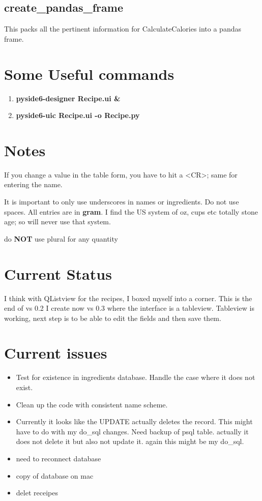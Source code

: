\documentclass[12pt]{article}
\begin{document}
\subsection{create\_pandas\_frame}
This packs all the pertinent information for CalculateCalories into a pandas frame.


\section{Some Useful commands}
\begin{enumerate}
\item {\bf pyside6-designer Recipe.ui \&}
\item {\bf pyside6-uic Recipe.ui -o Recipe.py}
\end{enumerate}

\section{Notes}
If you change a value in the table form, you have to hit a <CR>; same for entering the name.

It is important to only use underscores in names or ingredients. Do not use spaces. All entries are in {\bf gram}. I find the US system of oz, cups etc totally stone age; so will never use that system.

do {\bf NOT} use plural for any quantity

\section{Current Status}
I think with QListview for the recipes, I boxed myself into a corner. This is the end of vs 0.2
I create now vs 0.3 where the interface is a tableview. Tableview is working, next step is to be able to edit the fields and then save them.

\section{Current issues}
\begin{itemize}
\item Test for existence in ingredients database. Handle the case where it does not exist.
\item Clean up the code with consistent name scheme.
\item Currently it looks like the UPDATE actually deletes the record. This might have to do with my do\_sql changes. 
Need backup of psql table. actually it does not delete it but also not update it. again this might be my do\_sql.

\item need to reconnect database
\item copy of database on mac
\item delet receipes



\end{itemize}
\end{document}
